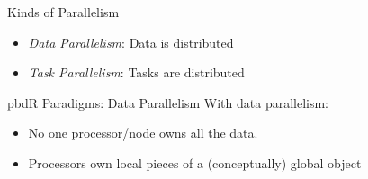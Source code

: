 
\begin{frame}
  \begin{block}{Kinds of Parallelism}\pause
    \begin{itemize}[<+-|alert@+>]
      \item \emph{Data Parallelism}:  Data is distributed
      \item \emph{Task Parallelism}:  Tasks are distributed
  \end{itemize}
  \end{block}
\end{frame}


\begin{frame}
  \begin{block}{pbdR Paradigms:  Data Parallelism}
  With data parallelism:
  \begin{itemize}[<+-|alert@+>]
   \item No one processor/node owns all the data.
   \item Processors own local pieces of a (conceptually) global object
  \end{itemize}
  \end{block}
\end{frame}


